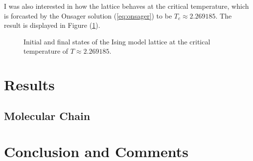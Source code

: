 \documentclass[10pt, titlepage, a4paper]{article}
\begin{document}
I was also interested in how the lattice behaves at the critical temperature, which is forcasted by the Onsager solution (\ref{eq:onsager}) to be
$T_c\approx 2.269185$. The result is displayed in Figure (\ref{fig:ising-demo-critical}).

\begin{figure}[H]
    \centering
    \caption{Initial and final states of the Ising model lattice at the critical temperature of $T\approx 2.269185$.}
    \label{fig:ising-demo-critical}
\end{figure}




\section{Results}
\subsection{Molecular Chain}



\section{Conclusion and Comments}




\end{document}
